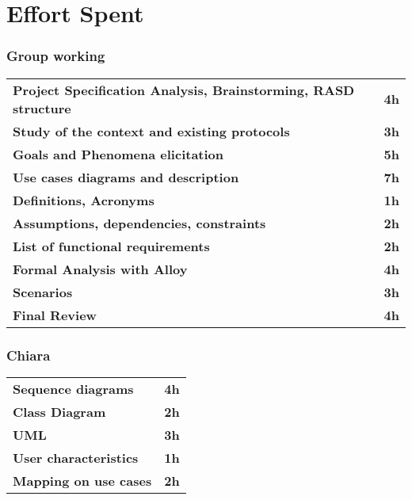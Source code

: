 \chapter{Effort Spent}
\subsection*{Group working}
\begin{table}[H]
    \begin{tabular}{lr}
        \toprule
        \textbf{Project Specification Analysis, Brainstorming, RASD structure} & \textbf{4h} \\
        \textbf{Study of the context and existing protocols}                   & \textbf{3h} \\
        \textbf{Goals and Phenomena elicitation}                               & \textbf{5h} \\
        \textbf{Use cases diagrams and description}                            & \textbf{7h} \\
        \textbf{Definitions, Acronyms}                                         & \textbf{1h} \\
        \textbf{Assumptions, dependencies, constraints}                        & \textbf{2h} \\
        \textbf{List of functional requirements}                               & \textbf{2h} \\
        \textbf{Formal Analysis with Alloy}                                    & \textbf{4h} \\
        \textbf{Scenarios}                                                     & \textbf{3h} \\
        \textbf{Final Review}                                                  & \textbf{4h} \\
        \bottomrule
    \end{tabular}
\end{table}

\subsection*{Chiara}
\begin{table}[H]
    \begin{tabular}{lr}
        \toprule
        \textbf{Sequence diagrams}                                             & \textbf{4h} \\
        \textbf{Class Diagram}                                                 & \textbf{2h}  \\
        \textbf{UML}                                                           & \textbf{3h}  \\
        \textbf{User characteristics}                                          & \textbf{1h}  \\
        \textbf{Mapping on use cases}                                          & \textbf{2h}   \\
        \bottomrule
    \end{tabular}
\end{table}

